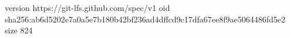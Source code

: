 version https://git-lfs.github.com/spec/v1
oid sha256:ab6d5202e7a0a5e7b180b42bf236ad4dffcd9c17dfa67ee8f9ae5064486fd5e2
size 824
